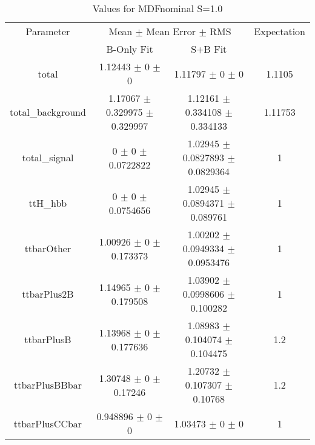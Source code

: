 \begin{table}
\centering
\caption{Values for MDFnominal S=1.0}
\begin{tabular}{cccc}
\toprule
Parameter & \multicolumn{2}{c}{Mean $\pm$ Mean Error $\pm$ RMS} & Expectation\\
 & B-Only Fit & S+B Fit & \\
\midrule
total & \num{1.12443} $\pm$ \num{0} $\pm$ \num{0} & \num{1.11797} $\pm$ \num{0} $\pm$ \num{0} & \num{1.1105}\\
total\_background & \num{1.17067} $\pm$ \num{0.329975} $\pm$ \num{0.329997} & \num{1.12161} $\pm$ \num{0.334108} $\pm$ \num{0.334133} & \num{1.11753}\\
total\_signal & \num{0} $\pm$ \num{0} $\pm$ \num{0.0722822} & \num{1.02945} $\pm$ \num{0.0827893} $\pm$ \num{0.0829364} & \num{1}\\
ttH\_hbb & \num{0} $\pm$ \num{0} $\pm$ \num{0.0754656} & \num{1.02945} $\pm$ \num{0.0894371} $\pm$ \num{0.089761} & \num{1}\\
ttbarOther & \num{1.00926} $\pm$ \num{0} $\pm$ \num{0.173373} & \num{1.00202} $\pm$ \num{0.0949334} $\pm$ \num{0.0953476} & \num{1}\\
ttbarPlus2B & \num{1.14965} $\pm$ \num{0} $\pm$ \num{0.179508} & \num{1.03902} $\pm$ \num{0.0998606} $\pm$ \num{0.100282} & \num{1}\\
ttbarPlusB & \num{1.13968} $\pm$ \num{0} $\pm$ \num{0.177636} & \num{1.08983} $\pm$ \num{0.104074} $\pm$ \num{0.104475} & \num{1.2}\\
ttbarPlusBBbar & \num{1.30748} $\pm$ \num{0} $\pm$ \num{0.17246} & \num{1.20732} $\pm$ \num{0.107307} $\pm$ \num{0.10768} & \num{1.2}\\
ttbarPlusCCbar & \num{0.948896} $\pm$ \num{0} $\pm$ \num{0} & \num{1.03473} $\pm$ \num{0} $\pm$ \num{0} & \num{1}\\
\bottomrule
\end{tabular}
\end{table}